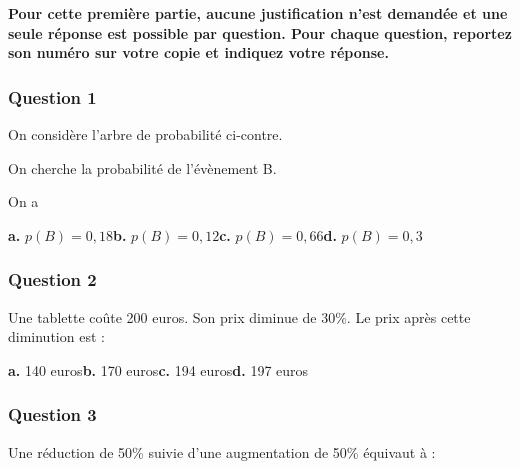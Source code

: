 
\textbf{Pour cette première partie, aucune justification n'est demandée et une seule réponse est possible par question. Pour chaque question, reportez son numéro sur votre copie et indiquez votre réponse.}

\subsubsection*{Question 1}

\begin{minipage}[t]{0.5\textwidth}
On considère l'arbre de probabilité ci-contre.

On cherche la probabilité de l'évènement B.

\medskip

On a
\end{minipage}
\begin{minipage}[t]{0.45\textwidth}
\vspace{0pt}
\begin{center}
\end{center}
\end{minipage}

\textbf{a.} $p(B) = 0,18$\hfill \textbf{b.} $p(B) = 0,12$\hfill \textbf{c.} $p(B) = 0,66$\hfill \textbf{d.} $p(B) = 0,3$

\subsubsection*{Question 2}
Une tablette coûte 200 euros. Son prix diminue de 30\%. Le prix après cette diminution est :

\textbf{a.} 140 euros\hfill \textbf{b.} 170 euros\hfill \textbf{c.} 194 euros\hfill \textbf{d.} 197 euros

\subsubsection*{Question 3}
Une réduction de 50\% suivie d'une augmentation de 50\% équivaut à :


